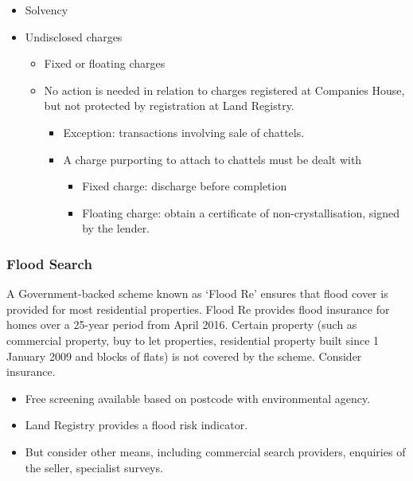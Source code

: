 \documentclass[
]{article}
\providecommand{\tightlist}{%
  \setlength{\itemsep}{0pt}\setlength{\parskip}{0pt}}
\begin{document}
\begin{itemize}
\tightlist
\item
  Solvency
\item
  Undisclosed charges

  \begin{itemize}
  \tightlist
  \item
    Fixed or floating charges
  \item
    No action is needed in relation to charges registered at Companies
    House, but not protected by registration at Land Registry.

    \begin{itemize}
    \tightlist
    \item
      Exception: transactions involving sale of chattels.
    \item
      A charge purporting to attach to chattels must be dealt with

      \begin{itemize}
      \tightlist
      \item
        Fixed charge: discharge before completion
      \item
        Floating charge: obtain a certificate of non-crystallisation,
        signed by the lender.
      \end{itemize}
    \end{itemize}
  \end{itemize}
\end{itemize}

\hypertarget{flood-search}{%
\subsubsection{Flood Search}\label{flood-search}}

A Government-backed scheme known as `Flood Re' ensures that flood cover
is provided for most residential properties. Flood Re provides flood
insurance for homes over a 25-year period from April 2016. Certain
property (such as commercial property, buy to let properties,
residential property built since 1 January 2009 and blocks of flats) is
not covered by the scheme. Consider insurance.

\begin{itemize}
\tightlist
\item
  Free screening available based on postcode with environmental agency.
\item
  Land Registry provides a flood risk indicator.
\item
  But consider other means, including commercial search providers,
  enquiries of the seller, specialist surveys.
\end{itemize}
\end{document}

